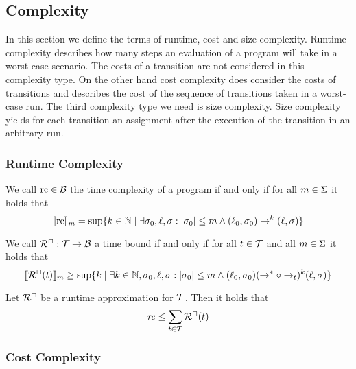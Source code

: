 \subsection{Complexity}

In this section we define the terms of runtime, cost and size complexity.
Runtime complexity describes how many steps an evaluation of a program will take in a worst-case scenario.
The costs of a transition are not considered in this complexity type.
On the other hand cost complexity does consider the costs of transitions and describes the cost of the sequence of transitions taken in a worst-case run.
The third complexity type we need is size complexity.
Size complexity yields for each transition an assignment  after the execution of the transition in an arbitrary run.

\subsubsection{Runtime Complexity}

\begin{definition}
  We call $\text{rc} \in \mathcal{B}$ the time complexity of a program if and only if for all $m \in \Sigma$ it holds that
  \[ \llbracket \text{rc} \rrbracket_{m} = \sup \lbrace  k \in \mathbb{N} \mid \exists \sigma_0, \ell, \sigma: \left|\sigma_0\right| \leq m \wedge (\ell_0, \sigma_0) \rightarrow^k (\ell, \sigma)  \rbrace \]
\end{definition}

\begin{definition}
  We call ${\mathcal{R}^\sqcap}: \mathcal{T} \rightarrow \mathcal{B}$ a time bound if and only if for all $t \in \mathcal{T}$ and all $m \in \Sigma$ it holds that
  \[ \llbracket {\mathcal{R}^\sqcap}(t) \rrbracket_{m} \geq \sup \lbrace  k \mid \exists k \in \mathbb{N}, \sigma_0, \ell, \sigma: \left|\sigma_0\right| \leq m \wedge (\ell_0, \sigma_0) (\rightarrow^* \circ \rightarrow_t)^k (\ell, \sigma)  \rbrace \]
\end{definition}

\begin{theorem}
	Let ${\mathcal{R}^\sqcap}$ be a runtime approximation for $\mathcal{T}$.
	Then it holds that 
	\[ \mathit{rc} \leq \sum_{t \in \mathcal{T}}{\mathcal{R}^\sqcap}(t) \]
\end{theorem}

\subsubsection{Cost Complexity}

